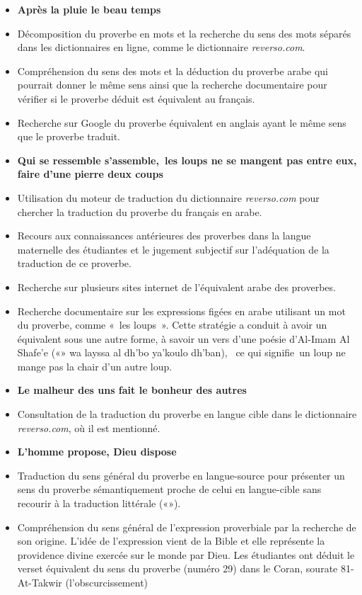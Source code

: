 \documentclass[french]{textolivre}
\begin{document}
\begin{itemize}
    \item \textbf{Après la pluie le beau temps}
    \item Décomposition du proverbe en mots et la recherche du sens des mots séparés dans les dictionnaires en ligne, comme le dictionnaire \textit{reverso.com}.
    \item Compréhension du sens des mots et la déduction du proverbe arabe qui pourrait donner le même sens ainsi que la recherche documentaire pour vérifier si le proverbe déduit est équivalent au français.
    \item Recherche sur Google du proverbe équivalent en anglais ayant le même sens que le proverbe traduit.
    \item \textbf{Qui se ressemble s’assemble, les loups ne se mangent pas entre eux, faire d’une pierre deux coups}
   \item Utilisation du moteur de traduction du dictionnaire \textit{reverso.com} pour chercher la traduction du proverbe du français en arabe.
   \item Recours aux connaissances antérieures des proverbes dans la langue maternelle des étudiantes et le jugement subjectif sur l’adéquation de la traduction de ce proverbe. 
   \item Recherche sur plusieurs sites internet de l’équivalent arabe des proverbes.
   \item Recherche documentaire sur les expressions figées en arabe utilisant un mot du proverbe, comme « les loups ». Cette stratégie a conduit à avoir un équivalent sous une autre forme, à savoir un vers d’une poésie d’Al-Imam Al Shafe'e («» wa layssa al dh'bo ya'koulo dh'ban),  ce qui signifie un loup ne mange pas la chair d’un autre loup.
   \item \textbf{Le malheur des uns fait le bonheur des autres}
   \item Consultation de la traduction du proverbe en langue cible dans le dictionnaire \textit{reverso.com}, où il est mentionné.
   \item \textbf{L’homme propose, Dieu dispose}
   \item Traduction du sens général du proverbe en langue-source pour présenter un sens du proverbe sémantiquement proche de celui en 
   langue-cible sans recourir à la traduction littérale («»).
   \item Compréhension du sens général de l’expression proverbiale par la recherche de son origine. L’idée de l’expression vient de la Bible et elle représente la providence divine exercée sur le monde par Dieu. Les étudiantes ont déduit le verset équivalent du sens du proverbe (numéro 29) dans le Coran, sourate 81- At-Takwir (l’obscurcissement) 

\end{itemize}
\end{document}
